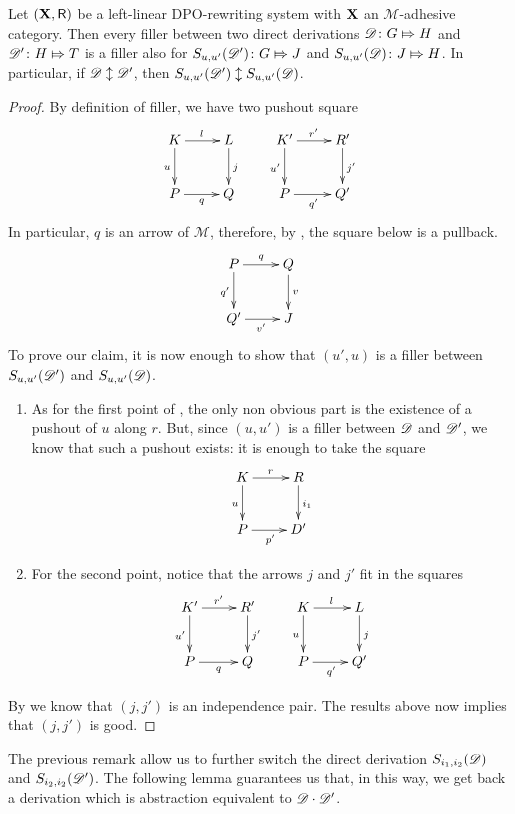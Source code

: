 \begin{theorem}\label{prop:fil}Let $(\textbf {\textup{X}}, \mathsf{R})$ be a left-linear DPO-rewriting system with $\textbf {\textup{X}}$ an $\mathcal{M}$-adhesive category. Then every filler between two direct derivations $\mathscr{D}\colon G\Mapsto H$ and $\mathscr{D}'\colon H\Mapsto T$ is a filler also for $S_{u,u'}(\mathscr{D'})\colon G\Mapsto J$ and $S_{u,u'}(\mathscr{D})\colon J\Mapsto H$. In particular, if $\mathscr{D}\updownarrow \mathscr{D}'$, then $S_{u,u'}(\mathscr{D}')\updownarrow S_{u,u'}(\mathscr{D})$.
\end{theorem}
\begin{proof}By definition of filler, we have two pushout square
		\[\xymatrix{K \ar[r]^{l} \ar[d]_{u}& L \ar[d]^{j} & K' \ar[r]^{r'} \ar[d]_{u'} & R' \ar[d]^{j'}\\ P \ar[r]_q & Q & P \ar[r]_{q'} & Q'}\]
		In particular, $q$ is an arrow of $\mathcal{M}$, therefore, by , the square below is a pullback.
		\[\xymatrix{P \ar[r]^{q} \ar[d]_{q'}& Q\ar[d]^{v}\\ Q' \ar[r]_{v'} & J}\]
		To prove our claim, it is now enough to show that $(u',u)$ is a filler between $S_{u,u'}(\mathscr{D}')$ and $S_{u, u'}(\mathscr{D})$.
		\begin{enumerate}
			\item As for the first  point of , the only non obvious part is the existence of a pushout of $u$ along $r$. But, since $(u,u')$ is a filler between $\mathscr{D}$ and $\mathscr{D'}$, we know that such a pushout exists: it is enough to take the square
			\[\xymatrix{K \ar[r]^{r} \ar[d]_{u}& R \ar[d]^{i_1} \\P \ar[r]_{p'}& D'}\]
			\item For the second point, notice that the arrows $j$ and $j'$ fit in the squares
	\[\xymatrix{K' \ar[r]^{r'} \ar[d]_{u'}& R' \ar[d]^{j'} &K \ar[r]^{l} \ar[d]_{u}& L\ar[d]^{j} \\P \ar[r]_{q}& Q& P \ar[r]_{q'} & Q'}\] 
		\end{enumerate}
		
By  we know that $(j,j')$ is an independence pair. The results above now implies that $(j,j')$ is good.
\end{proof}

The previous remark allow us to further switch the direct derivation $S_{i_1,i_2}(\mathscr{D})$ and $S_{i_2,i_2}(\mathscr{D}')$. The following lemma guarantees us that, in this way, we get back a derivation which is abstraction equivalent to $\mathscr{D}\cdot \mathscr{D}'$.

